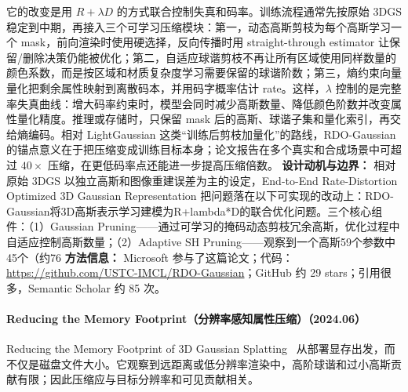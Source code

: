 它的改变是用 $R+\lambda D$ 的方式联合控制失真和码率。训练流程通常先按原始 3DGS 稳定到中期，再接入三个可学习压缩模块：第一，动态高斯剪枝为每个高斯学习一个 mask，前向渲染时使用硬选择，反向传播时用 straight-through estimator 让保留/删除决策仍能被优化；第二，自适应球谐剪枝不再让所有区域使用同样数量的颜色系数，而是按区域和材质复杂度学习需要保留的球谐阶数；第三，熵约束向量量化把剩余属性映射到离散码本，并用码字概率估计 rate。这样，$\lambda$ 控制的是完整率失真曲线：增大码率约束时，模型会同时减少高斯数量、降低颜色阶数并改变属性量化精度。推理或存储时，只保留 mask 后的高斯、球谐子集和量化索引，再交给熵编码。相对 LightGaussian 这类“训练后剪枝加量化”的路线，RDO-Gaussian 的锚点意义在于把压缩变成训练目标本身；论文报告在多个真实和合成场景中可超过 $40\times$ 压缩，在更低码率点还能进一步提高压缩倍数。
\textbf{设计动机与边界：} 相对原始 3DGS 以独立高斯和图像重建误差为主的设定，End-to-End Rate-Distortion Optimized 3D Gaussian Representation 把问题落在以下可实现的改动上：RDO-Gaussian将3D高斯表示学习建模为R+lambda*D的联合优化问题。三个核心组件：（1）Gaussian Pruning——通过可学习的掩码动态剪枝冗余高斯，优化过程中自适应控制高斯数量；（2）Adaptive SH Pruning——观察到一个高斯59个参数中45个（约76%
\textbf{方法信息：} Microsoft 参与了这篇论文；代码：\url{https://github.com/USTC-IMCL/RDO-Gaussian}；GitHub 约 29 stars；引用很多，Semantic Scholar 约 85 次。



\paragraph{Reducing the Memory Footprint（分辨率感知属性压缩）（2024.06）}
Reducing the Memory Footprint of 3D Gaussian Splatting~\cite{2406_17074} 从部署显存出发，而不仅是磁盘文件大小。它观察到远距离或低分辨率渲染中，高阶球谐和过小高斯贡献有限；因此压缩应与目标分辨率和可见贡献相关。

